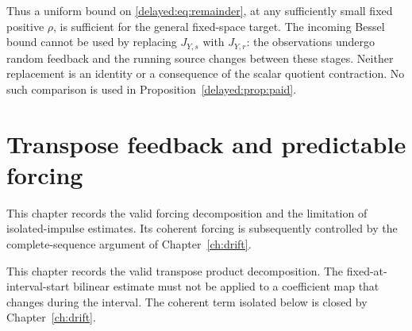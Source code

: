 \documentclass[11pt,oneside,openany,a4paper]{book}
\numberwithin{equation}{chapter}
\theoremstyle{definition}
\theoremstyle{remark}
\newcommand{\proofstep}[1]{\par\addvspace{.45\baselineskip}\Needspace{3\baselineskip}\textbf{#1}\par\nobreak}
\newcommand{\R}{\mathbb R}\newcommand{\E}{\mathbb E}\newcommand{\Prb}{\mathbb P}\newcommand{\PP}{\mathbb P}
\newcommand{\T}{\mathsf T}\newcommand{\Id}{I}
\newcommand{\F}[1]{\left\lVert#1\right\rVert_F}
\newcommand{\N}[1]{\left\lVert#1\right\rVert}
\newcommand{\op}[1]{\left\lVert#1\right\rVert_{\rm op}}
\newcommand{\ip}[2]{\left\langle#1,#2\right\rangle_F}
\DeclareMathOperator{\tr}{tr}\DeclareMathOperator{\rank}{rank}
\DeclareMathOperator{\diag}{blockdiag}\DeclareMathOperator{\range}{range}
\DeclareMathOperator{\HSS}{HSS}\DeclareMathOperator{\dist}{dist}
\DeclareMathOperator{\Var}{Var}\DeclareMathOperator{\supp}{supp}
\newcommand{\UC}{\mathcal U}\newcommand{\VC}{\mathcal V}\newcommand{\err}{\mathcal E}
\newcommand{\Sn}[2]{\left\lVert#1\right\rVert_{S_{#2}}}
\newcommand{\Cov}{\mathsf C}\newcommand{\Loss}{\mathsf L}\newcommand{\Fil}{\mathcal F}
\DeclareMathOperator{\diver}{div}\DeclareMathOperator{\vecop}{vec}\DeclareMathOperator{\Gammafun}{Gamma}
\begin{document}
Thus a uniform bound on \eqref{delayed:eq:remainder}, at any sufficiently small
fixed positive $\rho$, is sufficient for the general fixed-space target.
The incoming Bessel bound cannot be used by replacing $J_{Y,s}$ with
$J_{Y,r}$: the observations undergo random feedback and the running
source changes between these stages. Neither replacement is an identity
or a consequence of the scalar quotient contraction. No such comparison
is used in Proposition~\ref{delayed:prop:paid}.

\endgroup

\begingroup
\let\R\relax
\newcommand{\R}{\mathbb R}
\let\E\relax
\newcommand{\E}{\mathbb E}
\let\Prb\relax
\newcommand{\Prb}{\mathbb P}
\let\T\relax
\newcommand{\T}{\mathsf T}
\let\F\relax
\newcommand{\F}[1]{\left\lVert#1\right\rVert_{F}}
\let\N\relax
\newcommand{\N}[1]{\left\lVert#1\right\rVert}
\let\ip\relax
\newcommand{\ip}[2]{\left\langle#1,#2\right\rangle_F}
\let\tr\relax
\newcommand{\tr}{\operatorname{tr}}
\let\rank\relax
\newcommand{\rank}{\operatorname{rank}}
\let\diag\relax
\newcommand{\diag}{\operatorname{blockdiag}}
\let\range\relax
\newcommand{\range}{\operatorname{range}}
\let\OPT\relax
\newcommand{\OPT}{\operatorname{OPT}}
\let\HSS\relax
\newcommand{\HSS}{\operatorname{HSS}}
\let\diver\relax
\newcommand{\diver}{\operatorname{div}}
\let\Var\relax
\newcommand{\Var}{\operatorname{Var}}
\let\UC\relax
\newcommand{\UC}{\mathcal U}
\let\VC\relax
\newcommand{\VC}{\mathcal V}
\let\err\relax
\newcommand{\err}{\mathcal E}
\let\proofstep\relax
\newcommand{\proofstep}[1]{\par\addvspace{.45\baselineskip}\Needspace{3\baselineskip}\textbf{#1}\par\nobreak}
\let\op\relax
\newcommand{\op}[1]{\left\lVert#1\right\rVert_{\mathrm{op}}}
\let\Sn\relax
\newcommand{\Sn}[2]{\left\lVert#1\right\rVert_{S_{#2}}}
\let\Cov\relax
\newcommand{\Cov}{\mathsf C}
\let\Loss\relax
\newcommand{\Loss}{\mathsf L}
\let\Fil\relax
\newcommand{\Fil}{\mathcal F}
\let\Id\relax
\newcommand{\Id}{I}
\let\supp\relax
\newcommand{\supp}{\operatorname{supp}}
\let\vecop\relax
\newcommand{\vecop}{\operatorname{vec}}
\let\Gammafun\relax
\newcommand{\Gammafun}{\operatorname{Gamma}}
\chapter{Transpose feedback and predictable forcing}\label{ch:crossfeedback}
\begin{scopebox}
This chapter records the valid forcing decomposition and the limitation of isolated-impulse estimates. Its coherent forcing is subsequently controlled by the complete-sequence argument of Chapter~\ref{ch:drift}.
\end{scopebox}
This chapter records the valid transpose product decomposition. The fixed-at-interval-start bilinear estimate must not be applied to a coefficient map that changes during the interval. The coherent term isolated below is closed by Chapter~\ref{ch:drift}.
\end{document}
